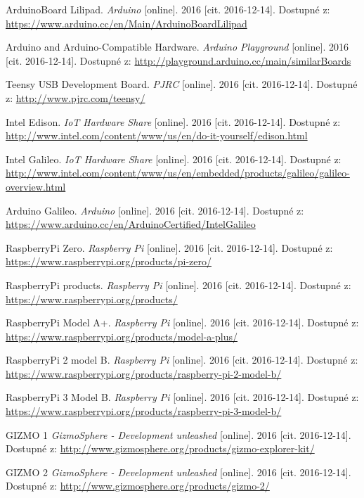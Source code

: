 \begin{literatura}{99}
 ArduinoBoard Lilipad. \textit{Arduino} [online]. 2016 [cit. 2016-12-14]. Dostupné z: \url{https://www.arduino.cc/en/Main/ArduinoBoardLilipad}

 Arduino and Arduino-Compatible Hardware. \textit{Arduino Playground} [online]. 2016 [cit. 2016-12-14]. Dostupné z: \url{http://playground.arduino.cc/main/similarBoards}

 Teensy USB Development Board. \textit{PJRC} [online]. 2016 [cit. 2016-12-14]. Dostupné z: \url{http://www.pjrc.com/teensy/}

 Intel Edison. \textit{IoT Hardware Share} [online]. 2016 [cit. 2016-12-14]. Dostupné z: \url{http://www.intel.com/content/www/us/en/do-it-yourself/edison.html}

 Intel Galileo. \textit{IoT Hardware Share} [online]. 2016 [cit. 2016-12-14]. Dostupné z: \url{http://www.intel.com/content/www/us/en/embedded/products/galileo/galileo-overview.html}

 Arduino Galileo. \textit{Arduino} [online]. 2016 [cit. 2016-12-14]. Dostupné z: \url{https://www.arduino.cc/en/ArduinoCertified/IntelGalileo}

 RaspberryPi Zero. \textit{Raspberry Pi} [online]. 2016 [cit. 2016-12-14]. Dostupné z: \url{https://www.raspberrypi.org/products/pi-zero/}
				
 RaspberryPi products. \textit{Raspberry Pi} [online]. 2016 [cit. 2016-12-14]. Dostupné z: \url{https://www.raspberrypi.org/products/}

 RaspberryPi Model A+. \textit{Raspberry Pi} [online]. 2016 [cit. 2016-12-14]. Dostupné z: \url{https://www.raspberrypi.org/products/model-a-plus/}

 RaspberryPi 2 model B. \textit{Raspberry Pi} [online]. 2016 [cit. 2016-12-14]. Dostupné z: \url{https://www.raspberrypi.org/products/raspberry-pi-2-model-b/}

 RaspberryPi 3 Model B. \textit{Raspberry Pi} [online]. 2016 [cit. 2016-12-14]. Dostupné z: \url{https://www.raspberrypi.org/products/raspberry-pi-3-model-b/}
				
 GIZMO 1 \textit{GizmoSphere - Development unleashed} [online]. 2016 [cit. 2016-12-14]. Dostupné z: \url{http://www.gizmosphere.org/products/gizmo-explorer-kit/}

 GIZMO 2 \textit{GizmoSphere - Development unleashed} [online]. 2016 [cit. 2016-12-14]. Dostupné z: \url{http://www.gizmosphere.org/products/gizmo-2/}


\end{literatura}
